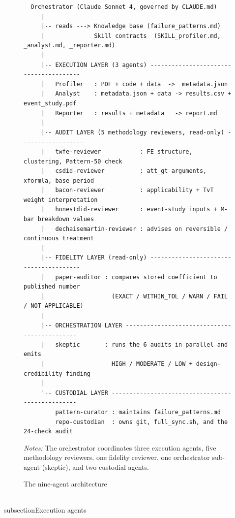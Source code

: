 \begin{figure}[H]
\centering
\begin{tcolorbox}[colback=gray!5, colframe=gray!60, width=\textwidth, title=Nine-agent architecture]
\footnotesize
\begin{verbatim}
  Orchestrator (Claude Sonnet 4, governed by CLAUDE.md)
     |
     |-- reads ---> Knowledge base (failure_patterns.md)
     |              Skill contracts  (SKILL_profiler.md, _analyst.md, _reporter.md)
     |
     |-- EXECUTION LAYER (3 agents) ---------------------------------------
     |   Profiler   : PDF + code + data  ->  metadata.json
     |   Analyst    : metadata.json + data -> results.csv + event_study.pdf
     |   Reporter   : results + metadata   -> report.md
     |
     |-- AUDIT LAYER (5 methodology reviewers, read-only) ------------------
     |   twfe-reviewer           : FE structure, clustering, Pattern-50 check
     |   csdid-reviewer          : att_gt arguments, xformla, base period
     |   bacon-reviewer          : applicability + TvT weight interpretation
     |   honestdid-reviewer      : event-study inputs + M-bar breakdown values
     |   dechaisemartin-reviewer : advises on reversible / continuous treatment
     |
     |-- FIDELITY LAYER (read-only) ---------------------------------------
     |   paper-auditor : compares stored coefficient to published number
     |                   (EXACT / WITHIN_TOL / WARN / FAIL / NOT_APPLICABLE)
     |
     |-- ORCHESTRATION LAYER ---------------------------------------------
     |   skeptic       : runs the 6 audits in parallel and emits
     |                   HIGH / MODERATE / LOW + design-credibility finding
     |
     '-- CUSTODIAL LAYER -------------------------------------------------
         pattern-curator : maintains failure_patterns.md
         repo-custodian  : owns git, full_sync.sh, and the 24-check audit
\end{verbatim}
\end{tcolorbox}
\caption{The nine-agent architecture}
\label{fig:pipeline_arch}
\vspace{4pt}
{\footnotesize\textit{Notes:} The orchestrator coordinates three execution agents, five methodology reviewers, one fidelity reviewer, one orchestrator sub-agent (skeptic), and two custodial agents.\par}
\end{figure}


\\subsection{Execution agents}
\label{sec:appc_execution}

